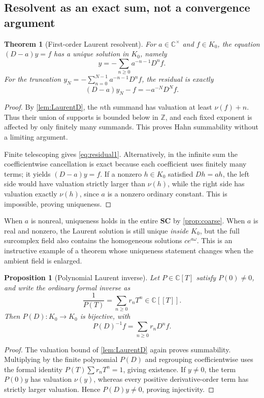 \documentclass[11pt,letterpaper]{article}
\numberwithin{equation}{section}
\newtheorem{theorem}{Theorem}[section]
\newtheorem{proposition}[proposition]{Proposition}
\theoremstyle{definition}
\theoremstyle{remark}
\newcommand{\SC}{\mathbf{SC}}
\newcommand{\C}{\mathbb C}
\newcommand{\Z}{\mathbb Z}
\begin{document}
\subsection{Resolvent as an exact sum, not a convergence argument}
\begin{theorem}[First-order Laurent resolvent]\label{thm:resolvent}
For $a\in\C^\times$ and $f\in K_0$, the equation $(D-a)y=f$ has a unique solution in $K_0$, namely
\begin{equation}\label{eq:resolvent}
 y=-\sum_{n\geq0}a^{-n-1}D^nf.
\end{equation}
For the truncation $y_N=-\sum_{n=0}^{N-1}a^{-n-1}D^nf$, the residual is exactly
\begin{equation}\label{eq:residual1}
 (D-a)y_N-f=-a^{-N}D^Nf.
\end{equation}
\end{theorem}
\begin{proof}
By \cref{lem:LaurentD}, the $n$th summand has valuation at least $\nu(f)+n$. Thus their union of supports is bounded below in $\Z$, and each fixed exponent is affected by only finitely many summands. This proves Hahn summability without a limiting argument.

Finite telescoping gives \eqref{eq:residual1}. Alternatively, in the infinite sum the coefficientwise cancellation is exact because each coefficient uses finitely many terms; it yields $(D-a)y=f$. If a nonzero $h\in K_0$ satisfied $Dh=ah$, the left side would have valuation strictly larger than $\nu(h)$, while the right side has valuation exactly $\nu(h)$, since $a$ is a nonzero ordinary constant. This is impossible, proving uniqueness.
\end{proof}

When $a$ is nonreal, uniqueness holds in the entire $\SC$ by \cref{prop:coarse}. When $a$ is real and nonzero, the Laurent solution is still unique \emph{inside $K_0$}, but the full surcomplex field also contains the homogeneous solutions $ce^{a\omega}$. This is an instructive example of a theorem whose uniqueness statement changes when the ambient field is enlarged.

\begin{proposition}[Polynomial Laurent inverse]\label{prop:polyresolvent}
Let $P\in\C[T]$ satisfy $P(0)\ne0$, and write the ordinary formal inverse as
\[
 \frac1{P(T)}=\sum_{n\geq0}r_nT^n\in\C[[T]].
\]
Then $P(D):K_0\to K_0$ is bijective, with
\[
 P(D)^{-1}f=\sum_{n\geq0}r_nD^nf.
\]
\end{proposition}
\begin{proof}
The valuation bound of \cref{lem:LaurentD} again proves summability. Multiplying by the finite polynomial $P(D)$ and regrouping coefficientwise uses the formal identity $P(T)\sum r_nT^n=1$, giving existence. If $y\ne0$, the term $P(0)y$ has valuation $\nu(y)$, whereas every positive derivative-order term has strictly larger valuation. Hence $P(D)y\ne0$, proving injectivity.
\end{proof}
\end{document}
